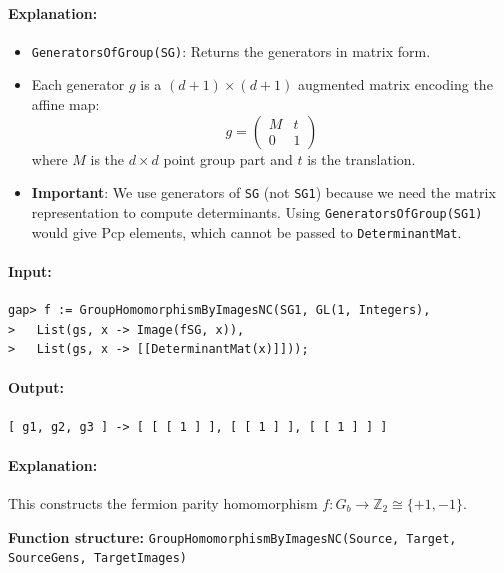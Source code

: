 \documentclass{SciPost}
\begin{document}
\paragraph{Explanation:}
\begin{itemize}
    \item \texttt{GeneratorsOfGroup(SG)}: Returns the generators in matrix form.
    \item Each generator $g$ is a $(d+1) \times (d+1)$ augmented matrix encoding the affine map:
    \begin{equation}
    g = \begin{pmatrix} M & t \\ 0 & 1 \end{pmatrix}
    \end{equation}
    where $M$ is the $d \times d$ point group part and $t$ is the translation.
    \item \textbf{Important}: We use generators of \texttt{SG} (not \texttt{SG1}) because we need the matrix representation to compute determinants. Using \texttt{GeneratorsOfGroup(SG1)} would give Pcp elements, which cannot be passed to \texttt{DeterminantMat}.
\end{itemize}

\paragraph{Input:}
\begin{verbatim}
gap> f := GroupHomomorphismByImagesNC(SG1, GL(1, Integers),
>   List(gs, x -> Image(fSG, x)),
>   List(gs, x -> [[DeterminantMat(x)]]));
\end{verbatim}

\paragraph{Output:}
\begin{verbatim}
[ g1, g2, g3 ] -> [ [ [ 1 ] ], [ [ 1 ] ], [ [ 1 ] ] ]
\end{verbatim}

\paragraph{Explanation:}
This constructs the fermion parity homomorphism $f: G_b \to \mathbb{Z}_2 \cong \{+1, -1\}$.

\textbf{Function structure:} \texttt{GroupHomomorphismByImagesNC(Source, Target, SourceGens, TargetImages)}
\end{document}
